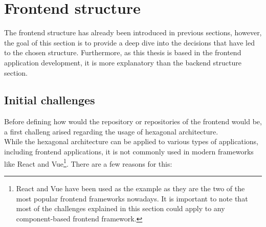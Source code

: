 \documentclass[../design.tex]{subfiles}
\begin{document}
\section{Frontend structure}
The frontend structure has already been introduced in previous sections,
however, the goal of this section is to provide a deep dive into the decisions
that have led to the chosen structure. Furthermore, as this thesis is based in
the frontend application development, it is more explanatory than the backend
structure section.
\subsection{Initial challenges}
Before defining how would the repository or repositories of the frontend would
be, a first challeng arised regarding the usage of hexagonal architecture.
\\
While the hexagonal architecture can be applied to various types of
applications, including frontend applications, it is not commonly used in modern
frameworks like React and Vue\footnote{React and Vue have been used as the
	example as they are the two of the most popular frontend frameworks nowadays. It
	is important to note that most of the challenges explained in this section could
	apply to any component-based frontend framework.}. There are a few reasons for
this:
\end{document}
